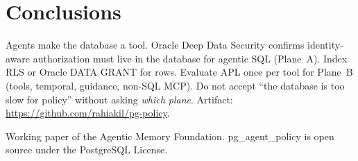 \documentclass[sigconf,review]{acmart}
\begin{document}
\section{Conclusions}

Agents make the database a tool. Oracle Deep Data Security confirms identity-aware authorization must live in the database for agentic SQL (Plane~A). Index RLS or Oracle DATA GRANT for rows. Evaluate APL once per tool for Plane~B (tools, temporal, guidance, non-SQL MCP). Do not accept ``the database is too slow for policy'' without asking \emph{which plane}. Artifact: \url{https://github.com/rahiakil/pg-policy}.

\begin{acks}
Working paper of the Agentic Memory Foundation. pg\_agent\_policy is open source under the PostgreSQL License.
\end{acks}



\end{document}
